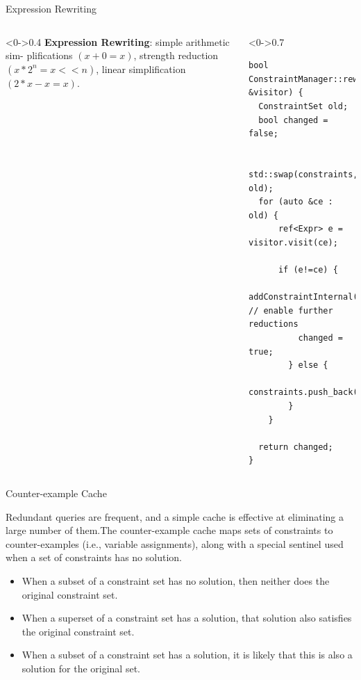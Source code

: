 \documentclass[9pt,aspectratio=43,mathserif,table]{beamer}
\begin{document}
\begin{frame}[fragile]{Expression Rewriting}
	\begin{columns}[T]
		\begin{column}<0->{0.4\textwidth}
			\textbf{Expression Rewriting}: simple arithmetic sim-
			plifications $(x + 0 = x)$, strength reduction $(x * 2^n
				= x << n)$, linear simplification $(2*x - x = x)$.
		\end{column}
		\hfill
		\begin{column}<0->{0.7\textwidth}
			\begin{lstlisting}
bool ConstraintManager::rewriteConstraints(ExprVisitor &visitor) {
  ConstraintSet old;
  bool changed = false;

  std::swap(constraints, old);
  for (auto &ce : old) {
      ref<Expr> e = visitor.visit(ce);

      if (e!=ce) {
          addConstraintInternal(e); // enable further reductions
          changed = true;
        } else {
          constraints.push_back(ce);
        }
    }

  return changed;
}
      \end{lstlisting}
		\end{column}
	\end{columns}
\end{frame}

\begin{frame}[fragile]{Counter-example Cache}

	Redundant queries are frequent, and a simple cache is effective at eliminating a
	large number of them.The counter-example cache maps sets of constraints to counter-examples (i.e., variable assignments), along with a special sentinel used when a set
	of constraints has no solution.
	\begin{itemize}
		\item<0-> When a subset of a constraint set has no solution,
		      then neither does the original constraint set.
		\item<0-> When a superset of a constraint set has a solution,
		      that solution also satisfies the original constraint set.
		\item<0-> When a subset of a constraint set has a solution, it is
		      likely that this is also a solution for the original set.
	\end{itemize}
\end{frame}
\end{document}
